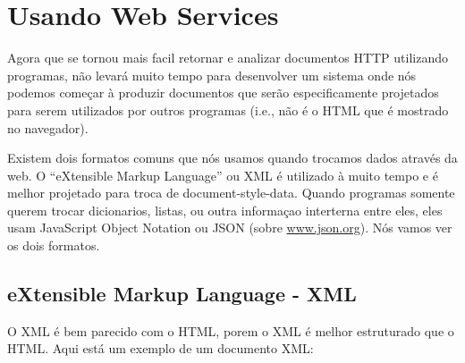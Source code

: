 
\chapter{Usando Web Services}

Agora que se tornou mais facil retornar e analizar documentos
HTTP utilizando programas, não levará muito tempo para desenvolver
um sistema onde nós podemos começar à produzir documentos que serão
especificamente projetados para serem utilizados por outros
programas (i.e., não é o HTML que é mostrado no navegador).

Existem dois formatos comuns que nós usamos quando trocamos dados através da web.
O ``eXtensible Markup Language'' ou XML é utilizado à muito tempo
e é melhor projetado para troca de document-style-data. Quando programas somente
querem trocar dicionarios, listas, ou outra informaçao interterna entre eles, 
eles usam JavaScript Object Notation ou JSON (sobre \url{www.json.org}).
Nós vamos ver os dois formatos.

\section{eXtensible Markup Language - XML}

O XML é bem parecido com o HTML, porem o XML é melhor estruturado
que o HTML. Aqui está um exemplo de um documento XML:

